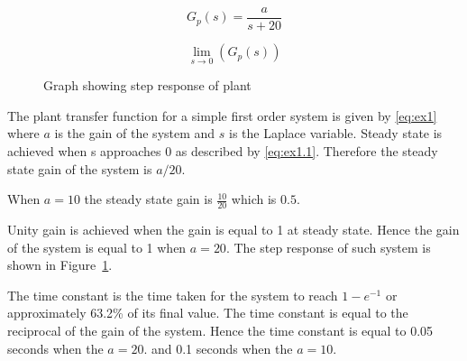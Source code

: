 \begin{equation}
    G_{p}\left(s\right)=\frac{a}{s+20}
    \label{eq:ex1}
\end{equation}

\begin{equation}
    \lim_{s\to0}\left(G_{p}\left(s\right)\right)
    \label{eq:ex1.1}
\end{equation}

\begin{figure}[ht!]
    \centering
    
    \caption{Graph showing step response of plant }
    \label{fig:ex1}
\end{figure}\FloatBarrier

The plant transfer function for a simple first order system is given by \eqref{eq:ex1} where $a$ is the gain of the system and $s$ is the Laplace variable. Steady state is achieved when s approaches 0 as described by \eqref{eq:ex1.1}. Therefore the steady state gain of the system is $a/20$.

When $a=10$ the steady state gain is $\frac{10}{20}$ which is $0.5$.

Unity gain is achieved when the gain is equal to 1 at steady state. Hence the gain of the system is equal to 1 when $a=20$. The step response of such system is shown in Figure~\ref{fig:ex1}.

The time constant is the time taken for the system to reach $1-e^{-1}$ or approximately 63.2\% of its final value. The time constant is equal to the reciprocal of the gain of the system. Hence the time constant is equal to 0.05 seconds when the $a=20$. and 0.1 seconds when the $a=10$. 





